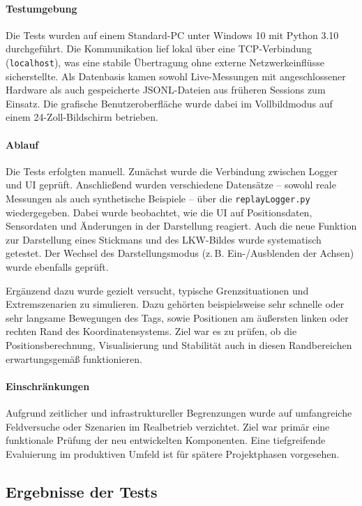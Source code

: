 \documentclass[a4paper, 12pt]{article} %
\begin{document}
\paragraph{Testumgebung}
Die Tests wurden auf einem Standard-PC unter Windows 10 mit Python 3.10 durchgeführt. Die Kommunikation lief lokal über eine TCP-Verbindung 
(\texttt{localhost}), was eine stabile Übertragung ohne externe Netzwerkeinflüsse sicherstellte. Als Datenbasis kamen sowohl Live-Messungen mit 
angeschlossener Hardware als auch gespeicherte \ac{JSONL}-Dateien aus früheren Sessions zum Einsatz. Die grafische Benutzeroberfläche wurde dabei im 
Vollbildmodus auf einem 24-Zoll-Bildschirm betrieben.

\paragraph{Ablauf}
Die Tests erfolgten manuell. Zunächst wurde die Verbindung zwischen Logger und UI geprüft. Anschließend wurden verschiedene Datensätze -- sowohl reale
 Messungen als auch synthetische Beispiele -- über die \texttt{replayLogger.py} wiedergegeben. Dabei wurde beobachtet, wie die UI auf Positionsdaten, 
 Sensordaten und Änderungen in der Darstellung reagiert. Auch die neue Funktion zur Darstellung eines Stickmans und des \ac{LKW}-Bildes wurde systematisch 
 getestet. Der Wechsel des Darstellungsmodus (z.\,B. Ein-/Ausblenden der Achsen) wurde ebenfalls geprüft.

Ergänzend dazu wurde gezielt versucht, typische Grenzsituationen und Extremszenarien zu simulieren. Dazu gehörten beispielsweise sehr schnelle oder 
sehr langsame Bewegungen des Tags, sowie Positionen am äußersten linken oder rechten Rand des Koordinatensystems. Ziel war es zu prüfen, ob die 
Positionsberechnung, Visualisierung und Stabilität auch in diesen Randbereichen erwartungsgemäß funktionieren.

\paragraph{Einschränkungen}
Aufgrund zeitlicher und infrastruktureller Begrenzungen wurde auf umfangreiche Feldversuche oder Szenarien im Realbetrieb verzichtet. Ziel 
war primär eine funktionale Prüfung der neu entwickelten Komponenten. Eine tiefgreifende Evaluierung im produktiven Umfeld ist für spätere 
Projektphasen vorgesehen.



\subsection{Ergebnisse der Tests}
\end{document}
